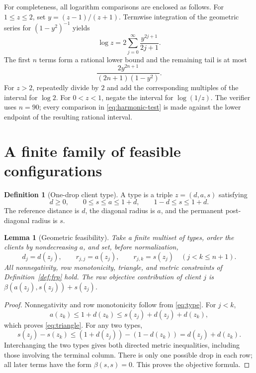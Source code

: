 \documentclass[11pt]{article}
\numberwithin{equation}{section}
\newtheorem{lemma}[theorem]{Lemma}
\theoremstyle{definition}
\newtheorem{definition}[theorem]{Definition}
\begin{document}
For completeness, all logarithm comparisons are enclosed as follows.
For $1\le z\le2$, set $y=(z-1)/(z+1)$. Termwise integration of the geometric
series for $(1-y^2)^{-1}$ yields
\begin{equation}\label{eq:logseries}
 \log z=2\sum_{j=0}^{\infty}\frac{y^{2j+1}}{2j+1}.
\end{equation}
The first $n$ terms form a rational lower bound and the remaining tail is
at most
\begin{equation}\label{eq:logtail}
 \frac{2y^{2n+1}}{(2n+1)(1-y^2)}.
\end{equation}
For $z>2$, repeatedly divide by $2$ and add the corresponding multiples of
the interval for $\log2$. For $0<z<1$, negate the interval for $\log(1/z)$.
The verifier uses $n=90$; every comparison in \eqref{eq:harmonic-test} is
made against the lower endpoint of the resulting rational interval.

\section{A finite family of feasible configurations}\label{sec:clients}

\begin{definition}[One-drop client type]\label{def:type}
A type is a triple $z=(d,a,s)$ satisfying
\begin{equation}\label{eq:type}
 d\ge0,\qquad 0\le s\le a\le1+d,\qquad 1-d\le s\le1+d.
\end{equation}
The reference distance is $d$, the diagonal radius is $a$, and the permanent
post-diagonal radius is $s$.
\end{definition}

\begin{lemma}[Geometric feasibility]\label{lem:geometry}
Take a finite multiset of types, order the clients by nondecreasing $a$, and
set, before normalization,
\begin{equation}\label{eq:type-rows}
 d_j=d(z_j),\qquad r_{j,j}=a(z_j),\qquad
 r_{j,k}=s(z_j)\quad(j<k\le n+1).
\end{equation}
All nonnegativity, row monotonicity, triangle, and metric constraints of
Definition~\ref{def:frp} hold. The raw objective contribution of client $j$
is $\beta(a(z_j),s(z_j))+s(z_j)$.
\end{lemma}
\begin{proof}
Nonnegativity and row monotonicity follow from \eqref{eq:type}.
For $j<k$,
\[
 a(z_k)\le1+d(z_k)\le s(z_j)+d(z_j)+d(z_k),
\]
which proves \eqref{eq:triangle}. For any two types,
\[
 s(z_j)-s(z_k)
 \le(1+d(z_j))-(1-d(z_k))=d(z_j)+d(z_k).
\]
Interchanging the two types gives both directed metric inequalities,
including those involving the terminal column. There is only one possible
drop in each row; all later terms have the form $\beta(s,s)=0$.
This proves the objective formula.
\end{proof}
\end{document}
